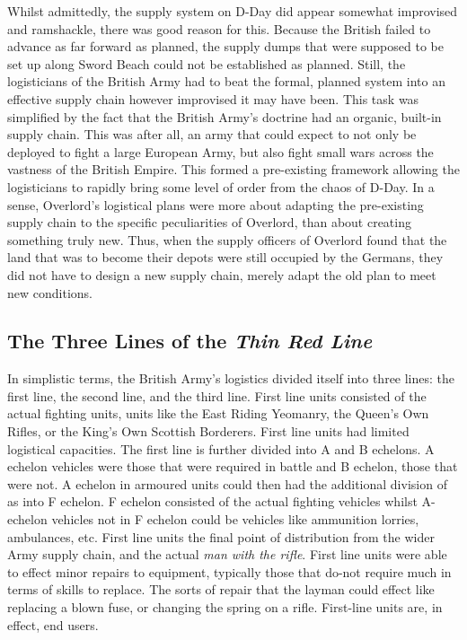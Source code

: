 \documentclass[noraggedright]{turabian-researchpaper}
\begin{document}
Whilst admittedly, the supply system on D-Day did appear somewhat improvised
and ramshackle, there was good reason for this.  Because the British failed to
advance as far forward as planned, the supply dumps that were supposed to be 
set up along Sword Beach could not be established as planned.  Still, the 
logisticians of the British Army had to beat the formal, planned system 
into an effective supply chain however improvised it may have been.  This 
task was simplified by the fact that 
the British Army's doctrine had an organic, built-in supply chain.  This was 
after all, an army that could expect to not only be deployed to fight a large 
European Army, but also fight small wars across the vastness of the British 
Empire.  This formed a pre-existing framework allowing the logisticians to
rapidly bring some level of order from the 
chaos of D-Day.  In a sense, Overlord's logistical plans were more about 
adapting the pre-existing supply chain to the specific peculiarities of 
Overlord, than about creating something truly new.  Thus, when the supply 
officers of Overlord found that the land that was to become their depots were 
still occupied by the Germans, they did not have to design a 
new supply chain, merely adapt the old plan to meet new conditions.

\subsection{The Three Lines of the \textit{Thin Red Line}}

In simplistic terms, the British Army's logistics divided itself into three 
lines: the first line, the second line, and the third line.  First line units 
consisted of the actual fighting units, units like the East Riding Yeomanry, 
the Queen's Own Rifles, or the King's Own Scottish Borderers.  First line 
units had limited logistical capacities.  The first line is further divided
into A and B echelons.  A echelon vehicles were those that were required in 
battle and B echelon, those that were not.  A echelon in armoured units could 
then had the additional division of as into F echelon. F echelon consisted of 
the actual fighting vehicles whilst A-echelon vehicles not in F echelon 
could be vehicles like ammunition lorries, ambulances, etc.\autocite[RASCOrg]
[3--4]{pope-pp} %
First line units the final 
point of distribution from the wider Army supply chain, and the actual 
\textit{man with the rifle}. First line units were able to effect minor 
repairs to equipment, typically those that do-not require much in terms of 
skills to replace.  The sorts of repair that the layman could effect like 
replacing a blown fuse, or changing the spring on a rifle.  First-line units
are, in effect, end users.\autocite[s. 58(1)i, s. 102]{FSR1}  
\end{document}
